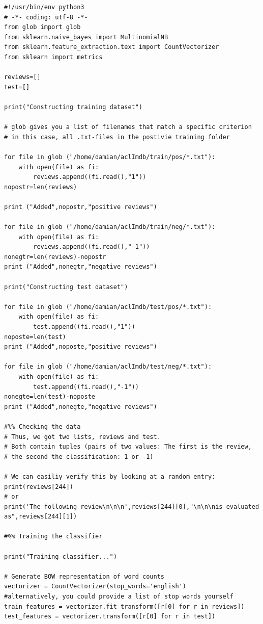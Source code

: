\documentclass[a4paper,12pt]{book}
\begin{document}
\begin{lstlisting}
#!/usr/bin/env python3
# -*- coding: utf-8 -*-
from glob import glob
from sklearn.naive_bayes import MultinomialNB
from sklearn.feature_extraction.text import CountVectorizer
from sklearn import metrics

reviews=[]
test=[]

print("Constructing training dataset")

# glob gives you a list of filenames that match a specific criterion
# in this case, all .txt-files in the postivie training folder

for file in glob ("/home/damian/aclImdb/train/pos/*.txt"):
    with open(file) as fi:
        reviews.append((fi.read(),"1"))
nopostr=len(reviews)

print ("Added",nopostr,"positive reviews")  

for file in glob ("/home/damian/aclImdb/train/neg/*.txt"):
    with open(file) as fi:
        reviews.append((fi.read(),"-1"))
nonegtr=len(reviews)-nopostr
print ("Added",nonegtr,"negative reviews")  
   
print("Constructing test dataset")

for file in glob ("/home/damian/aclImdb/test/pos/*.txt"):
    with open(file) as fi:
        test.append((fi.read(),"1"))
noposte=len(test)
print ("Added",noposte,"positive reviews")  

for file in glob ("/home/damian/aclImdb/test/neg/*.txt"):
    with open(file) as fi:
        test.append((fi.read(),"-1"))
nonegte=len(test)-noposte
print ("Added",nonegte,"negative reviews")  

#%% Checking the data
# Thus, we got two lists, reviews and test.
# Both contain tuples (pairs of two values: The first is the review, 
# the second the classification: 1 or -1)
    
# We can easiliy verify this by looking at a random entry:
print(reviews[244])
# or
print('The following review\n\n\n',reviews[244][0],"\n\n\nis evaluated as",reviews[244][1])
    
#%% Training the classifier                

print("Training classifier...")        

# Generate BOW representation of word counts
vectorizer = CountVectorizer(stop_words='english')   
#alternatively, you could provide a list of stop words yourself
train_features = vectorizer.fit_transform([r[0] for r in reviews])
test_features = vectorizer.transform([r[0] for r in test])


\end{lstlisting}
\end{document}
